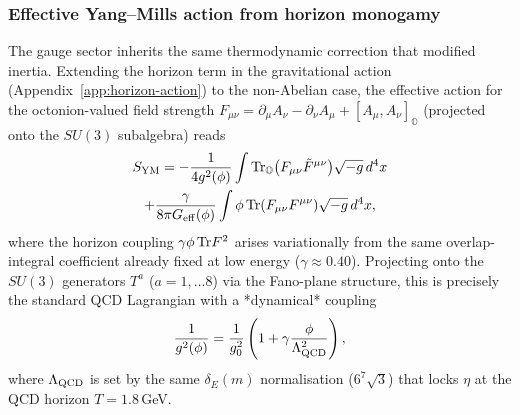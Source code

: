 \documentclass[12pt,a4paper]{article}
\begin{document}
\subsubsection{Effective Yang--Mills action from horizon monogamy}
The gauge sector inherits the same thermodynamic correction that modified inertia. Extending the horizon term in the gravitational action (Appendix~\ref{app:horizon-action}) to the non-Abelian case, the effective action for the octonion-valued field strength $F_{\mu\nu} = \partial_\mu A_\nu - \partial_\nu A_\mu + [A_\mu, A_\nu]_{\mathbb{O}}$ (projected onto the $SU(3)$ subalgebra) reads
\begin{multline*}
S_{\rm YM} = -\frac{1}{4 g^2(\phi)} \int {\rm Tr}_{\mathbb{O}} \bigl( F_{\mu\nu} \tilde{F}^{\mu\nu} \bigr) \sqrt{-g}\, d^4x \\
+ \frac{\gamma}{8\pi G_{\rm eff}(\phi)} \int \phi\, {\rm Tr}(F_{\mu\nu} F^{\mu\nu}) \sqrt{-g}\, d^4x,
\end{multline*}
where the horizon coupling $\gamma \phi\, {\rm Tr} F^2$ arises variationally from the same overlap-integral coefficient already fixed at low energy ($\gamma \approx 0.40$). Projecting onto the $SU(3)$ generators $T^a$ ($a=1,\dots8$) via the Fano-plane structure, this is precisely the standard QCD Lagrangian with a *dynamical* coupling
\[
\frac{1}{g^2(\phi)} = \frac{1}{g_0^2} \left(1 + \gamma \frac{\phi}{\Lambda_{\rm QCD}^2}\right),
\]
where $\Lambda_{\rm QCD}$ is set by the same $\delta_E(m)$ normalisation ($6^7\sqrt{3}$) that locks $\eta$ at the QCD horizon $T=1.8$\,GeV.
\end{document}

